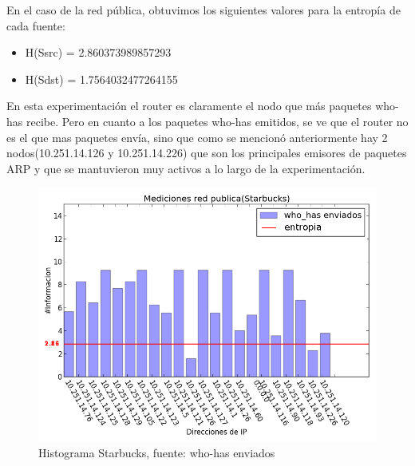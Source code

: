 En el caso de la red pública, obtuvimos los siguientes valores para la entropía de cada fuente:
\begin{itemize}
\item H(Ssrc) = 2.860373989857293
\item H(Sdst) = 1.7564032477264155
\end{itemize}

En esta experimentación el router es claramente el nodo que más paquetes who-has recibe. Pero en cuanto a los paquetes who-has emitidos, se ve que el router no es el que mas paquetes envía, sino que como se mencionó anteriormente hay 2 nodos(10.251.14.126 y 10.251.14.226) que son los principales emisores de paquetes ARP y que se mantuvieron muy activos a lo largo de la experimentación.

\begin{figure}[H]
	\begin{center}
		  \includegraphics[scale=0.4]{Graficos/starbucks_sent_who_has.png}
		  \caption{Histograma Starbucks, fuente: who-has enviados}
		  \label{fig:contra1}
	\end{center}
\end{figure}

